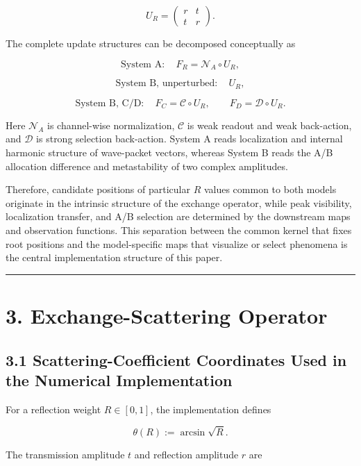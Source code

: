 \documentclass[
  a4paper,
  10pt]{article}
\begin{document}
\[
\boxed{
U_R=
\begin{pmatrix}
r&t\\
t&r
\end{pmatrix}
}.
\]

The complete update structures can be decomposed conceptually as

\[
\text{System A}:\quad F_R=\mathcal N_A\circ U_R,
\]

\[
\text{System B, unperturbed}:\quad U_R,
\]

\[
\text{System B, C/D}:\quad
F_C=\mathcal C\circ U_R,
\qquad
F_D=\mathcal D\circ U_R.
\]

Here \(\mathcal N_A\) is channel-wise normalization, \(\mathcal C\) is
weak readout and weak back-action, and \(\mathcal D\) is strong
selection back-action. System A reads localization and internal harmonic
structure of wave-packet vectors, whereas System B reads the A/B
allocation difference and metastability of two complex amplitudes.

Therefore, candidate positions of particular \(R\) values common to both
models originate in the intrinsic structure of the exchange operator,
while peak visibility, localization transfer, and A/B selection are
determined by the downstream maps and observation functions. This
separation between the common kernel that fixes root positions and the
model-specific maps that visualize or select phenomena is the central
implementation structure of this paper.

\begin{center}\rule{0.5\linewidth}{0.5pt}\end{center}

\section{3. Exchange-Scattering
Operator}\label{3-exchange-scattering-operator}

\subsection{3.1 Scattering-Coefficient Coordinates Used in the Numerical
Implementation}\label{31-scattering-coefficient-coordinates-used-in-the-numerical-implementation}

For a reflection weight \(R\in[0,1]\), the implementation defines

\[
\theta(R):=\arcsin\sqrt R.
\]

The transmission amplitude \(t\) and reflection amplitude \(r\) are
\end{document}
